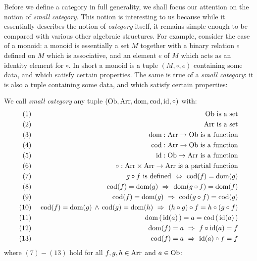 Before we define a category in full generality, we shall focus our attention
on the notion of {\em small category}. This notion is interesting to us 
because while it essentially describes the notion of {\em category} itself,
it remains simple enough to be compared with various other algebraic structures.
For example, consider the case of a monoid: a monoid is essentially a set $M$ 
together with 
a binary relation $\circ$ defined on $M$ which is associative, and an 
element $e$ of $M$ which acts as an identity element for $\circ$. In short 
a monoid is a tuple $(M,\circ,e)$ containing some data, and  which satisfy 
certain properties. The same is true of a {\em small category}: it is also
a tuple containing some data, and which satisfy certain properties:
\begin{defin}\label{Cat:def:category:small}
    We call {\em small category} any tuple $(\mbox{\rm Ob}, \mbox{\rm Arr}, \mbox{\rm dom}, \mbox{\rm cod}, \mbox{\rm id}, \circ)$ 
    with:
        \begin{eqnarray*}
            (1)&\ &\mbox{\rm Ob}\mbox{\ is a set}\\
            (2)&\ &\mbox{\rm Arr}\mbox{\ is a set}\\
            (3)&\ &\mbox{\rm dom}:\mbox{\rm Arr}\to\mbox{\rm Ob}\mbox{\ is a function}\\
            (4)&\ &\mbox{\rm cod}:\mbox{\rm Arr}\to\mbox{\rm Ob}\mbox{\ is a function}\\
            (5)&\ &\mbox{\rm id}:\mbox{\rm Ob}\to\mbox{\rm Arr}\mbox{\ is a function}\\
            (6)&\ &\circ:\mbox{\rm Arr}\times\mbox{\rm Arr}\to\mbox{\rm Arr}\mbox{\ is a partial function}\\
            (7)&\ &g\circ f\mbox{\ is defined}
                \ \Leftrightarrow\ \mbox{\rm cod}(f)=\mbox{\rm dom}(g) \\
            (8)&\ &\mbox{\rm cod}(f)=\mbox{\rm dom}(g)\ \Rightarrow\ \mbox{\rm dom}(g\circ f) = \mbox{\rm dom}(f)\\
            (9)&\ &\mbox{\rm cod}(f)=\mbox{\rm dom}(g)\ \Rightarrow\ \mbox{\rm cod}(g\circ f) = \mbox{\rm cod}(g)\\
            (10)&\ &\mbox{\rm cod}(f)=\mbox{\rm dom}(g)\,\land\,\mbox{\rm cod}(g)=\mbox{\rm dom}(h)
               \ \Rightarrow\ (h\circ g)\circ f = h\circ(g\circ f)\\
            (11)&\ &\mbox{\rm dom}\,(\,\mbox{\rm id}(a)\,) = a = \mbox{\rm cod}\,(\,\mbox{\rm id}(a)\,)\\
            (12)&\ &\mbox{\rm dom}(f)=a\ \Rightarrow\ f\circ\mbox{\rm id}(a) = f\\
            (13)&\ &\mbox{\rm cod}(f)=a\ \Rightarrow\ \mbox{\rm id}(a)\circ f = f
       \end{eqnarray*} 
    where $(7)-(13)$ hold for all $f,g,h\in\mbox{\rm Arr}$ and $a\in\mbox{\rm Ob}$: 
\end{defin}

